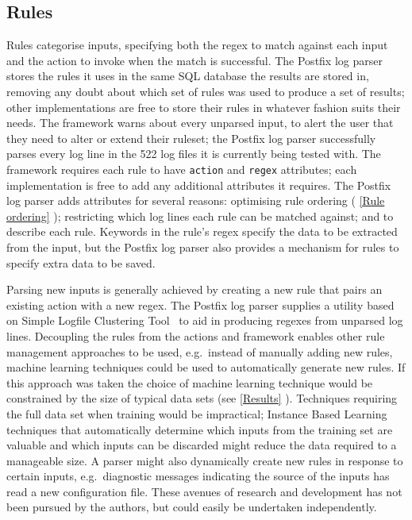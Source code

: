 \documentclass{svmult}
\newcommand{\sectionref}[1]{%
    \textsection{}\vref*{#1}%
}
\newcommand{\numberOFlogFILESall}[0]{%
    522%
}
\begin{document}
\subsection{Rules}

\label{Rules}

Rules categorise inputs, specifying both the regex to match against each
input and the action to invoke when the match is successful.  The Postfix
log parser stores the rules it uses in the same SQL database the results
are stored in, removing any doubt about which set of rules was used to
produce a set of results; other implementations are free to store their
rules in whatever fashion suits their needs.  The framework warns about
every unparsed input, to alert the user that they need to alter or extend
their ruleset; the Postfix log parser successfully parses every log line in
the \numberOFlogFILESall{} log files it is currently being tested with.
The framework requires each rule to have \texttt{action} and \texttt{regex}
attributes; each implementation is free to add any additional attributes it
requires.  The Postfix log parser adds attributes for several reasons:
optimising rule ordering (\sectionref{Rule ordering}); restricting which
log lines each rule can be matched against; and to describe each rule.
Keywords in the rule's regex specify the data to be extracted from the
input, but the Postfix log parser also provides a mechanism for rules to
specify extra data to be saved.

Parsing new inputs is generally achieved by creating a new rule that pairs
an existing action with a new regex.  The Postfix log parser supplies a
utility based on Simple Logfile Clustering Tool~\cite{slct-paper} to aid in
producing regexes from unparsed log lines.  Decoupling the rules from the
actions and framework enables other rule management approaches to be used,
e.g.\ instead of manually adding new rules, machine learning techniques
could be used to automatically generate new rules.  If this approach was
taken the choice of machine learning technique would be constrained by the
size of typical data sets (see \sectionref{Results}).  Techniques requiring
the full data set when training would be impractical; Instance Based
Learning~\cite{instance-based-learning} techniques that automatically
determine which inputs from the training set are valuable and which inputs
can be discarded might reduce the data required to a manageable size.  A
parser might also dynamically create new rules in response to certain
inputs, e.g.\ diagnostic messages indicating the source of the inputs has
read a new configuration file.  These avenues of research and development
has not been pursued by the authors, but could easily be undertaken
independently.
\end{document}
